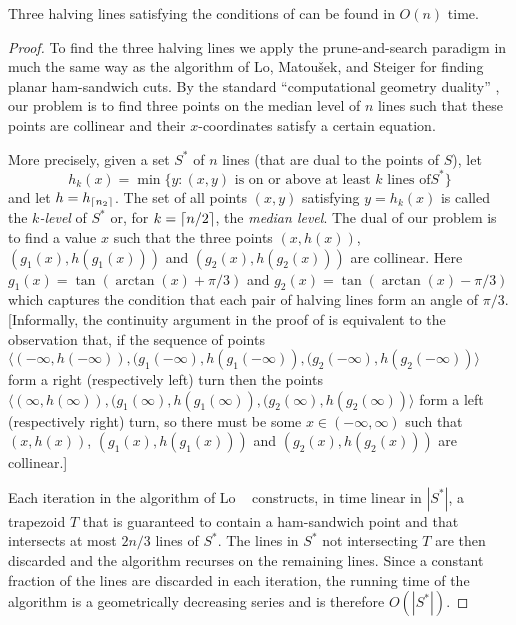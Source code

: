\documentclass[lotsofwhite]{patmorin}
\newcommand{\blau}[1]{\tan(\arctan(#1)+\pi/3)}
\newcommand{\bleu}[1]{\tan(\arctan(#1)-\pi/3)}
\begin{document}
\begin{lem}
Three halving lines satisfying the conditions of 
can be found in $O(n)$ time.
\end{lem}

\begin{proof}

To find the three halving lines we apply the prune-and-search paradigm
in much the same way as the algorithm of Lo, Matou\v{s}ek, and Steiger
\cite{lms94} for finding planar ham-sandwich cuts.  By the standard
``computational geometry duality'' \cite[Section~1.3.3]{bkoo97}, our problem
is to find three points on the median level of $n$ lines such that
these points are collinear and their $x$-coordinates satisfy a certain
equation.  

More precisely, given a set $S^*$ of $n$ lines (that are dual to the
points of $S$), let
\[
    h_k(x) = \min\{ y : 
        \mbox{$(x,y)$ is on or above at least $k$ lines of
$S^*$}\} 
\]
and let $h=h_{\left\lceil n_2 \right\rceil}$.  The set of all points $(x,y)$ satisfying
$y=h_k(x)$ is called the \emph{$k$-level} of $S^*$ or, for
$k=\left\lceil n/2 \right\rceil$, the \emph{median level}.
The dual of our problem is to find a value $x$ such that the three points
$(x,h(x))$, $(g_1(x),h(g_1(x)))$ and $(g_2(x),h(g_2(x)))$ are collinear.
Here $g_1(x)=\blau{x}$ and
$g_2(x)=\bleu{x}$ which captures the condition that each pair of halving
lines form an angle of $\pi/3$.  [Informally, the continuity argument in
the proof of  is equivalent to the observation
that, if the sequence of points $\langle(-\infty,h(-\infty)),
(g_1(-\infty),h(g_1(-\infty)), (g_2(-\infty),h(g_2(-\infty))\rangle$ form
a right (respectively left) turn then the points $\langle(\infty,h(\infty)),
(g_1(\infty),h(g_1(\infty)), (g_2(\infty),h(g_2(\infty))\rangle$ form a
left (respectively right) turn, so there must be some
$x\in(-\infty,\infty)$ such that 
$(x,h(x))$, $(g_1(x),h(g_1(x)))$ and $(g_2(x),h(g_2(x)))$ are
collinear.]

Each iteration in the algorithm of Lo \etal\ \cite{lms94} constructs,
in time linear in $|S^*|$, a trapezoid $T$ that is guaranteed to
contain a ham-sandwich point and that intersects at most $2n/3$ lines
of $S^*$.  The lines in $S^*$ not intersecting $T$ are then discarded
and the algorithm recurses on the remaining lines.  Since a constant
fraction of the lines are discarded in each iteration, the running
time of the algorithm is a geometrically decreasing series and is
therefore $O(|S^*|)$.


\end{proof}
\end{document}
